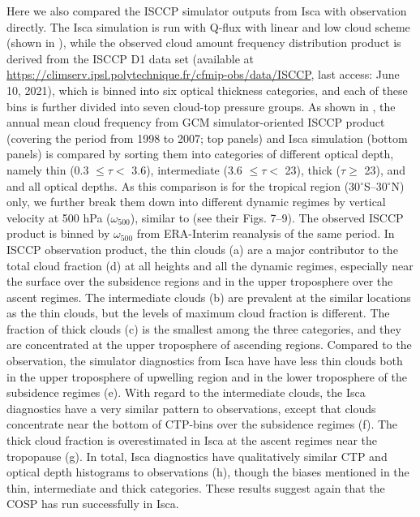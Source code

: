Here we also compared the ISCCP simulator outputs from Isca with observation directly. The Isca simulation is run with Q-flux with linear and low cloud scheme (shown in ), while the observed cloud amount frequency distribution product is derived from the ISCCP D1 data set \citep{Rossow1999advances} (available at \url{https://climserv.ipsl.polytechnique.fr/cfmip-obs/data/ISCCP}, last access: June 10, 2021), which is binned into six optical thickness categories, and each of these bins is further divided into seven cloud-top pressure groups. As shown in ,
the annual mean cloud frequency from  GCM simulator-oriented ISCCP product (covering the period from 1998 to 2007; top panels) and Isca simulation (bottom panels) is compared by sorting them into categories of different optical depth, namely thin (0.3 $\le\tau<$ 3.6), intermediate (3.6 $\le\tau<$ 23), thick ($\tau\ge$ 23), and and all optical depths. As this comparison is for the tropical region (30$^\circ$S--30$^\circ$N) only, we further break them down into different dynamic regimes by vertical velocity at 500 hPa ($\omega_{500}$), similar to \cite{Wyant2006comparison} (see their Figs. 7--9). The observed ISCCP product is binned by $\omega_{500}$ from ERA-Interim reanalysis of the same period. In ISCCP observation product, the thin clouds (a) are a major contributor to the total cloud fraction (d) at all heights and all the dynamic regimes, especially near the surface over the subsidence regions and in the upper troposphere over the ascent regimes. The intermediate clouds (b) are prevalent at the similar locations as the thin clouds, but the levels of maximum cloud fraction is different. The fraction of thick clouds (c) is the smallest among the three categories, and they are concentrated at the upper troposphere of ascending regions. Compared to the observation, the simulator diagnostics from Isca have have less thin clouds both in the upper troposphere of upwelling region and in the lower troposphere of the subsidence regimes (e). With regard to the intermediate clouds, the Isca diagnostics have a very similar pattern to observations, except that clouds concentrate near the bottom of CTP-bins over the subsidence regimes (f). The thick cloud fraction is overestimated in Isca at the ascent regimes near the tropopause (g). In total, Isca diagnostics have qualitatively similar CTP and optical depth histograms to observations (h), though the biases mentioned in the thin, intermediate and thick categories. These results suggest again that the COSP has run successfully in Isca. 


